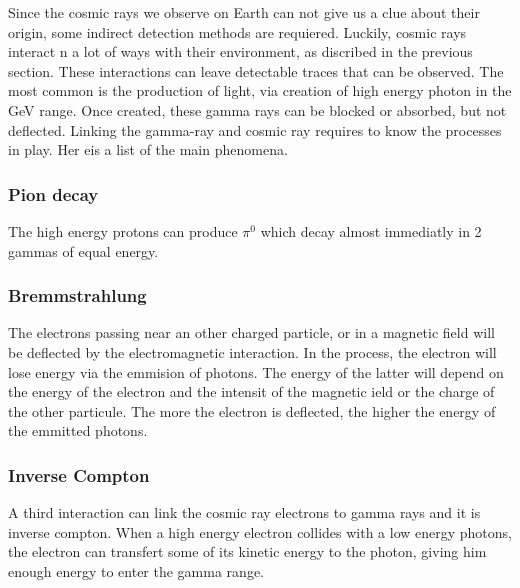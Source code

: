 Since the cosmic rays we observe on Earth can not give us a clue about their origin, some indirect detection methods are requiered. Luckily, cosmic rays interact n a lot of ways with their environment, as discribed in the previous section. These interactions can leave detectable traces that can be observed. The most common is the production of light, via creation of high energy photon in the GeV range. Once created, these gamma rays can be blocked or absorbed, but not deflected. Linking the gamma-ray and cosmic ray requires to know the processes in play. Her eis a list of the main phenomena.

\subsubsection{Pion decay}

The high energy protons can produce $\pi^{0}$ which decay almost immediatly in 2 gammas of equal energy.




\subsubsection{Bremmstrahlung}


The electrons passing near an other charged particle, or in a magnetic field will be deflected by the electromagnetic interaction. In the process, the electron will lose energy via the emmision of photons. The energy of the latter will depend on the energy of the electron and the intensit of the magnetic ield or the charge of the other particule. The more the electron is deflected, the higher the energy of the emmitted photons.


\subsubsection{Inverse Compton}


A third interaction can link the cosmic ray electrons to gamma rays and it is inverse compton. When a high energy electron collides with a low energy photons, the electron can transfert some of its kinetic energy to the photon, giving him enough energy to enter the gamma range.

